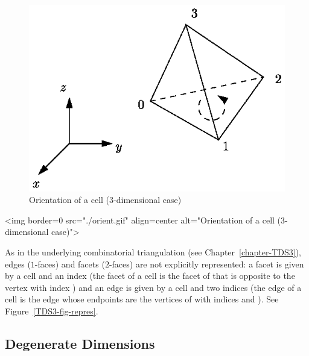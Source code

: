 \begin{ccTexOnly}
\begin{figure}[htbp]
\begin{center} 
\includegraphics{orient.eps} 
\end{center}
\caption{Orientation of a cell (3-dimensional case) 
\label{Triangulation3-fig-orient}}
\end{figure} 
\end{ccTexOnly}

\begin{ccHtmlOnly}
<img border=0 src="./orient.gif" align=center alt="Orientation of a cell 
(3-dimensional case)">
\end{ccHtmlOnly}

As in the underlying combinatorial triangulation (see
Chapter~\ref{chapter-TDS3}), edges ($1$-faces) and facets ($2$-faces)
are not explicitly 
represented: a facet is given by a cell and an index (the facet
 of a cell  is the facet of  that is opposite to
the vertex with index ) and an edge is given by a cell and two
indices (the edge  of a cell  is the edge whose
endpoints are the vertices of  with indices  and
). See Figure~\ref{TDS3-fig-repres}.  

\subsection{Degenerate Dimensions}
\label{Triangulation3-sec-degen_dim}

